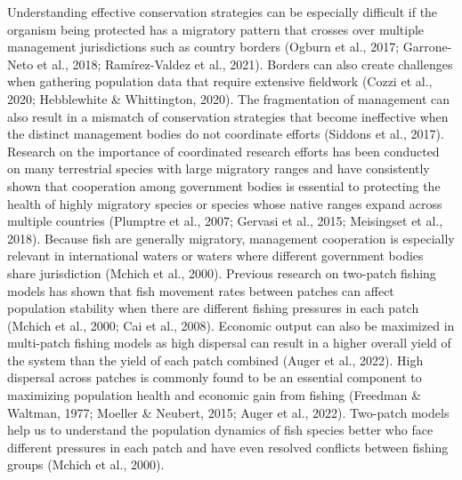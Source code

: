 \documentclass[
  12pt,
]{article}
\begin{document}
Understanding effective conservation strategies can be especially difficult if the organism being protected has a migratory pattern that crosses over multiple management jurisdictions such as country borders (Ogburn et al., 2017; Garrone-Neto et al., 2018; Ramírez-Valdez et al., 2021). Borders can also create challenges when gathering population data that require extensive fieldwork (Cozzi et al., 2020; Hebblewhite \& Whittington, 2020). The fragmentation of management can also result in a mismatch of conservation strategies that become ineffective when the distinct management bodies do not coordinate efforts (Siddons et al., 2017). Research on the importance of coordinated research efforts has been conducted on many terrestrial species with large migratory ranges and have consistently shown that cooperation among government bodies is essential to protecting the health of highly migratory species or species whose native ranges expand across multiple countries (Plumptre et al., 2007; Gervasi et al., 2015; Meisingset et al., 2018). Because fish are generally migratory, management cooperation is especially relevant in international waters or waters where different government bodies share jurisdiction (Mchich et al., 2000). Previous research on two-patch fishing models has shown that fish movement rates between patches can affect population stability when there are different fishing pressures in each patch (Mchich et al., 2000; Cai et al., 2008). Economic output can also be maximized in multi-patch fishing models as high dispersal can result in a higher overall yield of the system than the yield of each patch combined (Auger et al., 2022). High dispersal across patches is commonly found to be an essential component to maximizing population health and economic gain from fishing (Freedman \& Waltman, 1977; Moeller \& Neubert, 2015; Auger et al., 2022). Two-patch models help us to understand the population dynamics of fish species better who face different pressures in each patch and have even resolved conflicts between fishing groups (Mchich et al., 2000).
\end{document}
